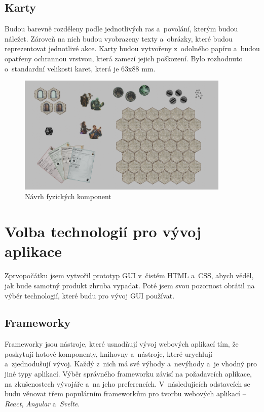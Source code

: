 \subsection{Karty}
Budou barevně rozděleny podle jednotlivých ras a~povolání, kterým budou náležet. Zároveň na nich budou vyobrazeny texty a~obrázky, které budou reprezentovat jednotlivé akce. Karty budou vytvořeny z~odolného papíru a~budou opatřeny ochrannou vrstvou, která zamezí jejich poškození. Bylo rozhodnuto o~standardní velikosti karet, která je 63x88 mm.

\begin{figure}[H]
    \centering
    \includegraphics[width=0.9\textwidth]{resources/figures/components.png}
    \caption{Návrh fyzických komponent}
    \label{fig:physical_components}
\end{figure}

\section{Volba technologií pro vývoj aplikace}
Zprvopočátku jsem vytvořil prototyp GUI v~čistém HTML a~CSS, abych věděl, jak bude samotný produkt zhruba vypadat. Poté jsem svou pozornost obrátil na výběr technologií, které budu pro vývoj GUI používat.

\subsection{Frameworky}
Frameworky jsou nástroje, které usnadňují vývoj webových aplikací tím, že poskytují hotové komponenty, knihovny a~nástroje, které urychlují a~zjednodušují vývoj. Každý z~nich má své výhody a~nevýhody a~je vhodný pro jiné typy aplikací. Výběr správného frameworku závisí na požadavcích aplikace, na zkušenostech vývojáře a~na jeho preferencích. V~následujících odstavcích se budu věnovat třem populárním frameworkům pro tvorbu webových aplikací -- \textit{React}, \textit{Angular} a~\textit{Svelte}.

